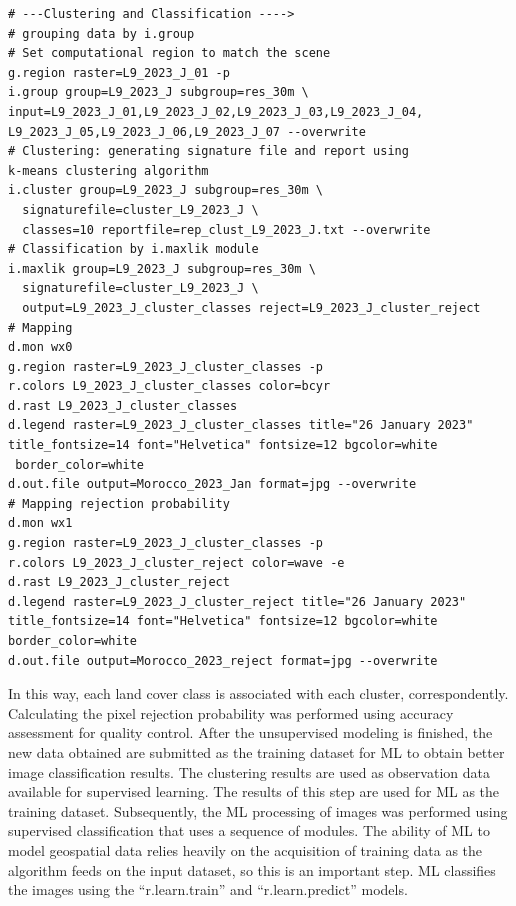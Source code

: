 \documentclass[geomatics,article,accept,pdftex,oneauthor]{Definitions/mdpi}
\begin{document}
\begin{footnotesize}
\begin{verbatim}
# ---Clustering and Classification ---->
# grouping data by i.group
# Set computational region to match the scene
g.region raster=L9_2023_J_01 -p
i.group group=L9_2023_J subgroup=res_30m \
input=L9_2023_J_01,L9_2023_J_02,L9_2023_J_03,L9_2023_J_04,
L9_2023_J_05,L9_2023_J_06,L9_2023_J_07 --overwrite
# Clustering: generating signature file and report using 
k-means clustering algorithm
i.cluster group=L9_2023_J subgroup=res_30m \
  signaturefile=cluster_L9_2023_J \
  classes=10 reportfile=rep_clust_L9_2023_J.txt --overwrite
# Classification by i.maxlik module
i.maxlik group=L9_2023_J subgroup=res_30m \
  signaturefile=cluster_L9_2023_J \
  output=L9_2023_J_cluster_classes reject=L9_2023_J_cluster_reject 
# Mapping
d.mon wx0
g.region raster=L9_2023_J_cluster_classes -p
r.colors L9_2023_J_cluster_classes color=bcyr
d.rast L9_2023_J_cluster_classes
d.legend raster=L9_2023_J_cluster_classes title="26 January 2023" 
title_fontsize=14 font="Helvetica" fontsize=12 bgcolor=white
 border_color=white
d.out.file output=Morocco_2023_Jan format=jpg --overwrite
# Mapping rejection probability
d.mon wx1
g.region raster=L9_2023_J_cluster_classes -p
r.colors L9_2023_J_cluster_reject color=wave -e
d.rast L9_2023_J_cluster_reject
d.legend raster=L9_2023_J_cluster_reject title="26 January 2023" 
title_fontsize=14 font="Helvetica" fontsize=12 bgcolor=white 
border_color=white
d.out.file output=Morocco_2023_reject format=jpg --overwrite
\end{verbatim}
\end{footnotesize}

In this way, each land cover class is associated with each cluster, correspondently. Calculating the pixel rejection probability was performed using accuracy assessment for quality control. After the unsupervised modeling is finished, the new data obtained are submitted as the training dataset for ML to obtain better image classification results. The clustering results are used as observation data available for supervised learning. The results of this step are used for ML as the training dataset. Subsequently, the ML processing of images was performed using supervised classification that uses a sequence of modules. The ability of ML to model geospatial data relies heavily on the acquisition of training data as the algorithm feeds on the input dataset, so this is an important step. ML classifies the images %
using the “r.learn.train” and “r.learn.predict” models.
\end{document}
